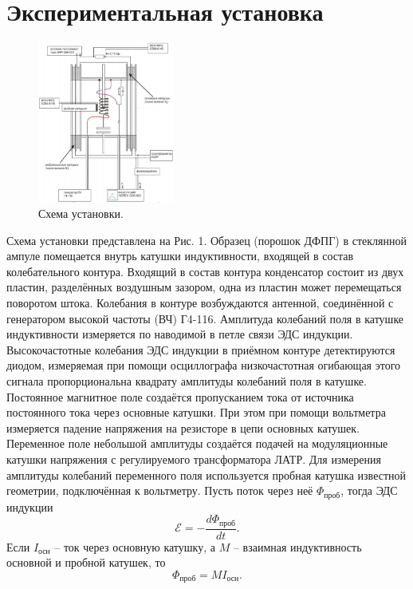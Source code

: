 \documentclass[a4paper,12pt]{article} %
\begin{document}
\newpage

\section{Экспериментальная установка}

\begin{figure}
\includegraphics[width = 0.4\textwidth]{1.png}
\centering
\caption{Схема установки.}
\end{figure}
Схема установки представлена на Рис. 1. Образец (порошок ДФПГ) в стеклянной ампуле помещается внутрь катушки индуктивности, входящей в состав колебательного контура. Входящий в состав контура конденсатор состоит из двух пластин, разделённых воздушным зазором, одна из пластин может перемещаться поворотом штока. Колебания в контуре возбуждаются антенной, соединённой с генератором высокой частоты (ВЧ) Г4-116. Амплитуда колебаний поля в катушке индуктивности
измеряется по наводимой в петле связи ЭДС индукции. Высокочастотные колебания ЭДС
индукции в приёмном контуре детектируются диодом, измеряемая при помощи
осциллографа низкочастотная огибающая этого сигнала пропорциональна квадрату
амплитуды колебаний поля в катушке.\\
Постоянное магнитное поле создаётся пропусканием тока от источника постоянного тока через основные катушки. При этом при помощи вольтметра измеряется падение напряжения на резисторе в цепи основных катушек. Переменное поле небольшой амплитуды создаётся подачей на модуляционные катушки напряжения с регулируемого трансформатора ЛАТР. Для измерения амплитуды колебаний переменного поля используется пробная катушка известной геометрии, подключённая к вольтметру. Пусть поток через неё $\Phi_{\text{проб}}$, тогда ЭДС индукции
\[\mathcal{E} = - \dfrac{d\Phi_{\text{проб}}}{dt}.\]
Если $I_{\text{осн}}$ -- ток через основную катушку, а $M$ -- взаимная индуктивность основной и пробной катушек, то
\[\Phi_{\text{проб}} = M I_{\text{осн}}.\]
\end{document}
